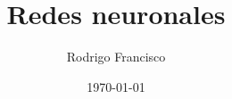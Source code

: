 \documentclass[12pt,a4paper]{article}
\author{Rodrigo Francisco}
\title{Redes neuronales}
\date{\today}
\begin{document}

  


 \coverpage 
\end{document}
